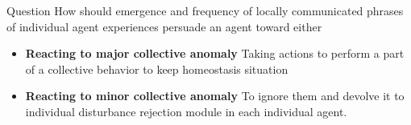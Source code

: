 \documentclass[unknownkeysallowed]{beamer}
\begin{document}
	\begin{frame}{Question}
		How should emergence and frequency of locally communicated phrases of individual agent experiences persuade an agent toward either 
		\begin{itemize}
			\item \textbf{Reacting to major collective anomaly} Taking actions to perform a part of a collective behavior to keep homeostasis situation
			\item \textbf{Reacting to minor collective anomaly} To ignore them and devolve it to individual disturbance rejection module in each individual agent. 
		\end{itemize}
	\end{frame}
\end{document}

